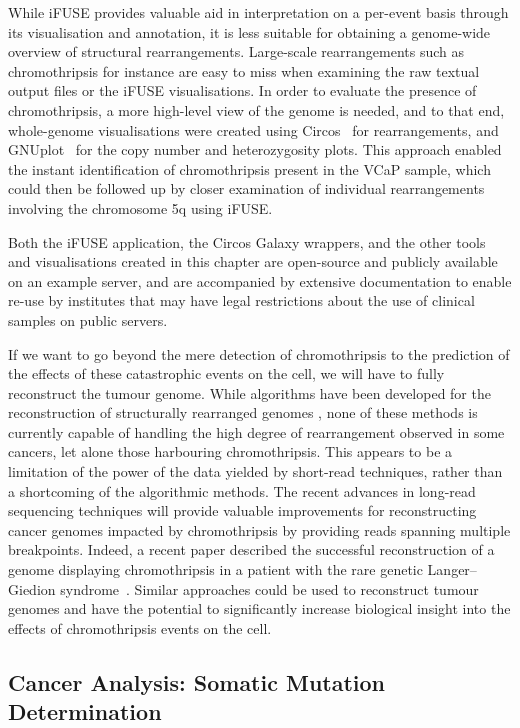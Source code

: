 While iFUSE provides valuable aid in interpretation on a per-event basis through its visualisation and annotation, it is less suitable for obtaining a genome-wide overview of structural rearrangements. Large-scale rearrangements such as chromothripsis for instance are easy to miss when examining the raw textual output files or the iFUSE visualisations. In order to evaluate the presence of chromothripsis, a more high-level view of the genome is needed, and to that end, whole-genome visualisations were created using Circos~\cite{circos} for rearrangements, and GNUplot~\cite{url-gnuplot} for the copy number and heterozygosity plots. This approach enabled the instant identification of chromothripsis present in the VCaP sample, which could then be followed up by closer examination of individual rearrangements involving the chromosome 5q using iFUSE.

Both the iFUSE application, the Circos Galaxy wrappers, and the other tools and visualisations created in this chapter are open-source and publicly available on an example server, and are accompanied by extensive documentation to enable re-use by institutes that may have legal restrictions about the use of clinical samples on public servers.

If we want to go beyond the mere detection of chromothripsis to the prediction of the effects of these catastrophic events on the cell, we will have to fully reconstruct the tumour genome.
While algorithms have been developed for the reconstruction of structurally rearranged genomes \cite{prego,Baca2013}, none of these methods is currently capable of handling the high degree of rearrangement observed in some cancers, let alone those harbouring chromothripsis.
This appears to be a limitation of the power of the data yielded by short-read techniques, rather than a shortcoming of the algorithmic methods.
The recent advances in long-read sequencing techniques will provide valuable improvements for reconstructing cancer genomes impacted by chromothripsis by providing reads spanning multiple breakpoints.
Indeed, a recent paper described the successful reconstruction of a genome displaying chromothripsis in a patient with the rare genetic Langer–Giedion syndrome~\cite{lei2020long}.
Similar approaches could be used to reconstruct tumour genomes and have the potential to significantly increase biological insight into the effects of chromothripsis events on the cell.

\subsection{Cancer Analysis: Somatic Mutation Determination}
